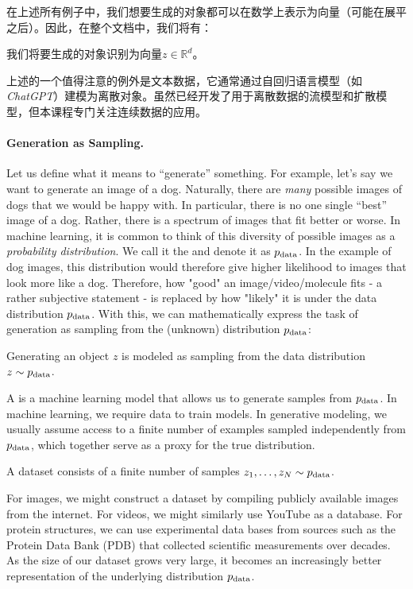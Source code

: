 在上述所有例子中，我们想要生成的对象都可以在数学上表示为向量（可能在展平之后）。因此，在整个文档中，我们将有：
\begin{ideabox}[对象作为向量]
    我们将要生成的对象识别为向量$z \in \mathbb{R}^d$。
\end{ideabox}
上述的一个值得注意的例外是文本数据，它通常通过自回归语言模型（如\emph{ChatGPT}）建模为离散对象。虽然已经开发了用于离散数据的流模型和扩散模型，但本课程专门关注连续数据的应用。



\paragraph{Generation as Sampling.}Let us define what it means to ``generate'' something. For example, let's say we want to generate an image of a dog. Naturally, there are \emph{many} possible images of dogs that we would be happy with. In particular, there is no one single ``best'' image of a dog. Rather, there is a spectrum of images that fit better or worse. In machine learning, it is common to think of this diversity of possible images as a \emph{probability distribution}. We call it the  and denote it as $p_{\rm{data}}$. In the example of dog images, this distribution would therefore give higher likelihood to images that look more like a dog. Therefore, how "good" an image/video/molecule fits - a rather subjective statement - is replaced by how "likely" it is under the data distribution $p_{\rm{data}}$. With this, we can mathematically express the task of generation as sampling from the (unknown) distribution $p_{\rm{data}}$:
\begin{ideabox}
    Generating an object $z$ is modeled as sampling from the data distribution $z\sim p_{\rm{data}}$.
\end{ideabox}
A  is a machine learning model that allows us to generate samples from $p_{\rm{data}}$. In machine learning, we require data to train models. In generative modeling, we usually assume access to a finite number of examples sampled independently from $p_{\rm{data}}$, which together serve as a proxy for the true distribution.
\begin{ideabox}[Dataset]
    A dataset consists of a finite number of samples $z_1, \dots, z_N \sim p_{\rm{data}}$.
\end{ideabox}
For images, we might construct a dataset by compiling publicly available images from the internet. For videos, we might similarly use YouTube as a database. For protein structures, we can use experimental data bases from sources such as the Protein Data Bank (PDB) that collected scientific measurements over decades. As the size of our dataset grows very large, it becomes an increasingly better representation of the underlying distribution $p_{\rm{data}}$.

